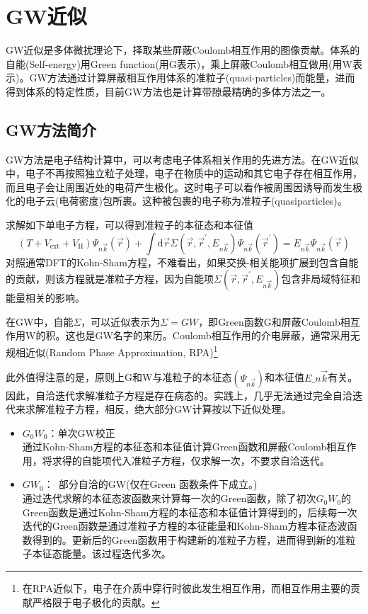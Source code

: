 \section{\rm{GW}近似}
\textrm{GW}近似是多体微扰理论下，择取某些屏蔽\textrm{Coulomb}相互作用的图像贡献。体系的自能\textrm{(Self-energy)}用\textrm{Green function}(用\textrm{G}表示)，乘上屏蔽\textrm{Coulomb}相互做用(用\textrm{W}表示)。\textrm{GW}方法通过计算屏蔽相互作用体系的准粒子\textrm{(quasi-particles)}而能量，进而得到体系的特定性质，目前\textrm{GW}方法也是计算带隙最精确的多体方法之一。

\subsection{\rm{GW}方法简介}
\textrm{GW}方法是电子结构计算中，可以考虑电子体系相关作用的先进方法。在\textrm{GW}近似中，电子不再按照独立粒子处理，电子在物质中的运动和其它电子存在相互作用，而且电子会让周围近处的电荷产生极化。这时电子可以看作被周围因诱导而发生极化的电子云(电荷密度)包所裹。这种被包裹的电子称为准粒子\textrm{(quasiparticles)}。

求解如下单电子方程，可以得到准粒子的本征态和本征值
\begin{displaymath}
	(T+V_{\mathrm{ext}}+V_{\mathrm{H}})\Psi_{n\vec k}(\vec r)+\int\mathrm{d}\vec r\Sigma(\vec r,\vec r^{\prime},E_{n\vec k})\Psi_{n\vec k}(\vec r^{\prime})=E_{n\vec k}\Psi_{n\vec k}(\vec r)
\end{displaymath}
对照通常\textrm{DFT}的\textrm{Kohn-Sham}方程，不难看出，如果交换-相关能项扩展到包含自能的贡献，则该方程就是准粒子方程，因为自能项$\Sigma(\vec r,\vec r^{\prime},E_{n\vec k})$包含非局域特征和能量相关的影响。

在\textrm{GW}中，自能$\Sigma$，可以近似表示为$\Sigma=GW$，即\textrm{Green}函数$\mathrm{G}$和屏蔽\textrm{Coulomb}相互作用$\mathrm{W}$的积。这也是\textrm{GW}名字的来历。\textrm{Coulomb}相互作用的介电屏蔽，通常采用无规相近似\textrm{(Random Phase Approximation, RPA)}\footnote{在\textrm{RPA}近似下，电子在介质中穿行时彼此发生相互作用，而相互作用主要的贡献严格限于电子极化的贡献。}

此外值得注意的是，原则上\textrm{G}和\textrm{W}与准粒子的本征态$(\Psi_{n\vec k})$和本征值$E\_{n\vec k}$有关。因此，自洽迭代求解准粒子方程是存在病态的。实践上，几乎无法通过完全自洽迭代来求解准粒子方程，相反，绝大部分\textrm{GW}计算按以下近似处理。
\begin{itemize}
	\item $G_0W_0$：单次\textrm{GW}校正\\
		通过\textrm{Kohn-Sham}方程的本征态和本征值计算\textrm{Green}函数和屏蔽\textrm{Coulomb}相互作用，将求得的自能项代入准粒子方程，仅求解一次，不要求自洽迭代。
	\item $GW_0$：~部分自洽的\textrm{GW}(仅在\textrm{Green} 函数条件下成立。)\\
		通过迭代求解的本征态波函数来计算每一次的\textrm{Green}函数，除了初次$G_0W_0$的\textrm{Green}函数是通过\textrm{Kohn-Sham}方程的本征态和本征值计算得到的，后续每一次迭代的\textrm{Green}函数是通过准粒子方程的本征能量和\textrm{Kohn-Sham}方程本征态波函数得到的。更新后的\textrm{Green}函数用于构建新的准粒子方程，进而得到新的准粒子本征态能量。该过程迭代多次。
\end{itemize}

